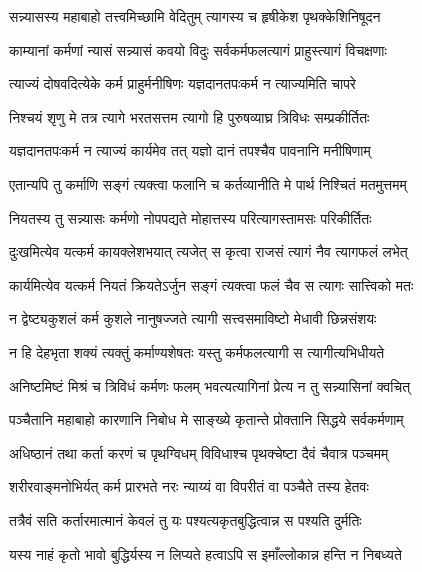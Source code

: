\twolineshloka
{सन्न्यासस्य महाबाहो तत्त्वमिच्छामि वेदितुम्}
{त्यागस्य च हृषीकेश पृथक्केशिनिषूदन}%

\twolineshloka
{काम्यानां कर्मणां न्यासं सन्न्यासं कवयो विदुः}
{सर्वकर्मफलत्यागं प्राहुस्त्यागं विचक्षणाः}%

\twolineshloka
{त्याज्यं दोषवदित्येके कर्म प्राहुर्मनीषिणः}
{यज्ञदानतपःकर्म न त्याज्यमिति चापरे}%

\twolineshloka
{निश्चयं शृणु मे तत्र त्यागे भरतसत्तम}
{त्यागो हि पुरुषव्याघ्र त्रिविधः सम्प्रकीर्तितः}%

\twolineshloka
{यज्ञदानतपःकर्म न त्याज्यं कार्यमेव तत्}
{यज्ञो दानं तपश्चैव पावनानि मनीषिणाम्}%

\twolineshloka
{एतान्यपि तु कर्माणि सङ्गं त्यक्त्वा फलानि च}
{कर्तव्यानीति मे पार्थ निश्चितं मतमुत्तमम्}%

\twolineshloka
{नियतस्य तु सन्न्यासः कर्मणो नोपपद्यते}
{मोहात्तस्य परित्यागस्तामसः परिकीर्तितः}%

\twolineshloka
{दुःखमित्येव यत्कर्म कायक्लेशभयात् त्यजेत्}
{स कृत्वा राजसं त्यागं नैव त्यागफलं लभेत्}%

\twolineshloka
{कार्यमित्येव यत्कर्म नियतं क्रियतेऽर्जुन}
{सङ्गं त्यक्त्वा फलं चैव स त्यागः सात्त्विको मतः}%

\twolineshloka
{न द्वेष्ट्यकुशलं कर्म कुशले नानुषज्जते}
{त्यागी सत्त्वसमाविष्टो मेधावी छिन्नसंशयः}%

\twolineshloka
{न हि देहभृता शक्यं त्यक्तुं कर्माण्यशेषतः}
{यस्तु कर्मफलत्यागी स त्यागीत्यभिधीयते}%

\twolineshloka
{अनिष्टमिष्टं मिश्रं च त्रिविधं कर्मणः फलम्}
{भवत्यत्यागिनां प्रेत्य न तु सन्न्यासिनां क्वचित्}%

\twolineshloka
{पञ्चैतानि महाबाहो कारणानि निबोध मे}
{साङ्ख्ये कृतान्ते प्रोक्तानि सिद्धये सर्वकर्मणाम्}%

\twolineshloka
{अधिष्ठानं तथा कर्ता करणं च पृथग्विधम्}
{विविधाश्च पृथक्चेष्टा दैवं चैवात्र पञ्चमम्}%

\twolineshloka
{शरीरवाङ्मनोभिर्यत् कर्म प्रारभते नरः}
{न्याय्यं वा विपरीतं वा पञ्चैते तस्य हेतवः}%

\twolineshloka
{तत्रैवं सति कर्तारमात्मानं केवलं तु यः}
{पश्यत्यकृतबुद्धित्वान्न स पश्यति दुर्मतिः}%

\twolineshloka
{यस्य नाहं कृतो भावो बुद्धिर्यस्य न लिप्यते}
{हत्वाऽपि स इमाँल्लोकान्न हन्ति न निबध्यते}%

